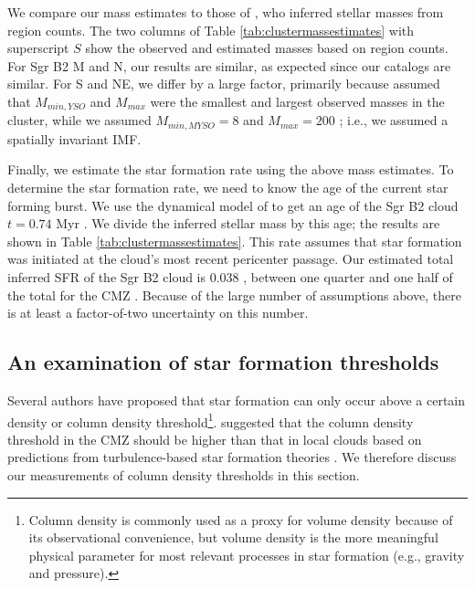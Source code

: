 \documentclass[twocolumn]{aastex61}
\begin{document}
We compare our mass estimates to those of \citet{Schmiedeke2016a}, who inferred
stellar masses from \hii region counts.  The  two columns of Table
\ref{tab:clustermassestimates} with superscript $S$ show the observed and
estimated masses based on
\hii region counts.  For Sgr B2 M and N, our results are similar, as expected
since our catalogs are similar.  For S and NE, we differ by a large factor,
primarily because \citet{Schmiedeke2016a} assumed that $M_{min,YSO}$ and $M_{max}$
were the smallest and largest observed masses in the cluster, while we assumed
$M_{min,MYSO}=8$ \msun and $M_{max}=200$ \msun; i.e., we assumed a spatially
invariant IMF.



Finally, we estimate the star formation rate using the above mass estimates.
To determine the star formation rate, we need to know the age of the current
star forming burst.  We use the dynamical model of \citet{Kruijssen2015a} to
get an age of the Sgr B2 cloud $t=0.74$ Myr \citep{Longmore2013a}.  We divide
the inferred stellar mass by this age; the results
are shown in Table \ref{tab:clustermassestimates}.  This rate assumes that star
formation was initiated at the cloud's most recent pericenter passage.  Our
estimated total inferred SFR of the Sgr B2 cloud is 0.038 \msun \peryr, between
one quarter and one half of the total for the CMZ
\citep{Longmore2013a,Barnes2017b}.  Because of the large number of assumptions
above, there is at least a factor-of-two uncertainty on this number.


% 

\subsection{An examination of star formation thresholds}
\label{sec:thresholds}
Several authors \citep[e.g.,][]{Lada2010a,Heiderman2010a} have proposed that star
formation can only occur above a certain density or column density
threshold\footnote{Column density is commonly used as a proxy for volume
density because of its observational convenience, but volume density is the
more meaningful physical parameter for most relevant processes in star formation
(e.g., gravity and pressure).}.  \citet{Kruijssen2014c} suggested that the
column density threshold in the CMZ should be higher than that in local clouds
based on predictions from turbulence-based star formation theories
\citep{Krumholz2005c,Padoan2011b}.
We therefore discuss our measurements of column density thresholds in this
section.
\end{document}
